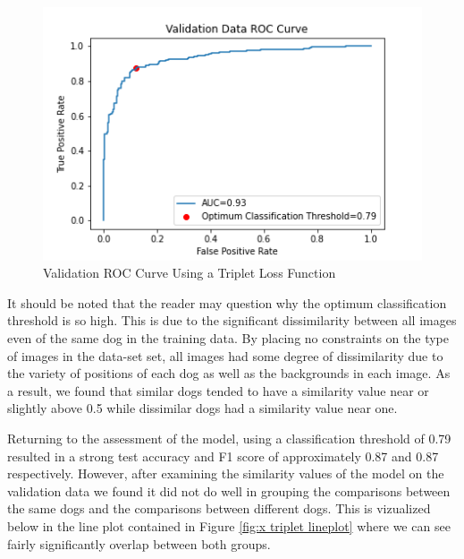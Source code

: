 \documentclass{article}
\begin{document}
\begin{figure}[h]
\centering
	\includegraphics[scale=0.7]{final-report-images/roc_curve_validation_triplet.png}
\caption{Validation ROC Curve Using a Triplet Loss Function}
\label{fig:x val roc curve}
\end{figure}

\noindent It should be noted that the reader may question why the optimum classification threshold is so high.  This is due to the significant dissimilarity between all images even of the same dog in the training data.  By placing no constraints on the type of images in the data-set set, all images had some degree of dissimilarity due to the variety of positions of each dog as well as the backgrounds in each image.  As a result, we found that similar dogs tended to have a similarity value near or slightly above 0.5 while dissimilar dogs had a similarity value near one.  

Returning to the assessment of the model, using a classification threshold of 0.79 resulted in a strong test accuracy and F1 score of approximately 0.87 and 0.87 respectively.  However, after examining the similarity values of the model on the validation data we found it did not do well in grouping the comparisons between the same dogs and the comparisons between different dogs.  This is vizualized below in the line plot contained in Figure \ref{fig:x triplet lineplot} where we can see fairly significantly overlap between both groups.
\end{document}

